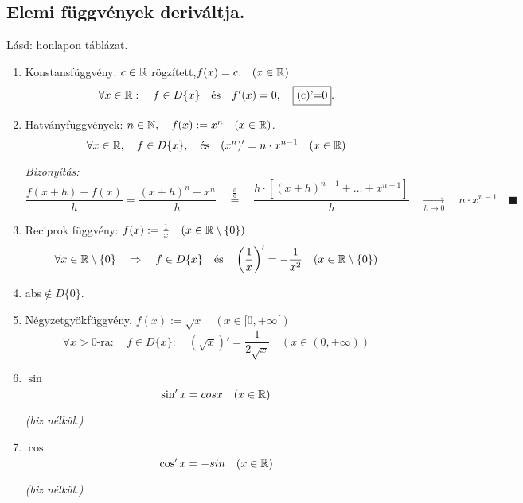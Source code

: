 \documentclass[a4paper,11.5pt]{article}
\begin{document}
	\subsection{Elemi függvények deriváltja.}
	\begin{note}
		Lásd: honlapon táblázat.
	\end{note}
	\begin{enumerate}
		\item Konstansfüggvény: $c\in \mathbb{R}$ rögzített,\quad  $f(x)=c.\quad (x\in\mathbb{R})$
		\[ \forall x\in\mathbb{R}:\quad f\in D\{x\}\quad \text{és}\quad f'(x)=0,\quad \fbox{(c)'=0}. \]
		\item Hatványfüggvények: $n\in\mathbb{N}, \quad f(x):=x^n\quad (x\in\mathbb{R})$.
		\[ \forall x \in\mathbb{R},\quad f\in D\{x\},\quad \text{és}\quad (x^n)'=n\cdot x^{n-1}\quad (x\in\mathbb{R}) \]
		
		\textit{Bizonyítás:} 
		\[ \frac{f(x+h)-f(x)}{h}=\frac{(x+h)^n-x^n}{h}\quad \overset{\frac{0}{0}}{=}\quad \frac{h\cdot[(x+h)^{n-1}+\ldots+x^{n-1}]}{h}\quad \underset{h\to0}{\longrightarrow}\quad n\cdot x^{n-1}\quad \blacksquare \]
		\item Reciprok függvény: $f(x):=\frac{1}{x}\quad (x\in\mathbb{R}\setminus\{0\})$
		\[ \forall x\in\mathbb{R}\setminus\{0\}\quad \Rightarrow\quad f\in D\{x\}\quad \text{és}\quad \left(\frac{1}{x}\right)'=-\frac{1}{x^2}\quad (x\in\mathbb{R}\setminus\{0\}) \]
		\item abs$\notin D\{0\}.$
		\item Négyzetgyökfüggvény. $f(x):=\sqrt{x}\quad (x\in[0,+\infty[)$
		\[ \forall x>0\text{-ra}: \quad f\in D\{x\}:\quad (\sqrt{x})'=\frac{1}{2\sqrt{x}}\quad (x\in(0,+\infty)) \]
		\item $\sin$
		\[ \sin'x=cosx\quad (x\in\mathbb{R}) \]
		
		\textit{(biz nélkül.)}
		\item $\cos$\[ \cos'x=-sin\quad (x\in\mathbb{R}) \]
		
		\textit{(biz nélkül.)}
	\end{enumerate}
\end{document}
